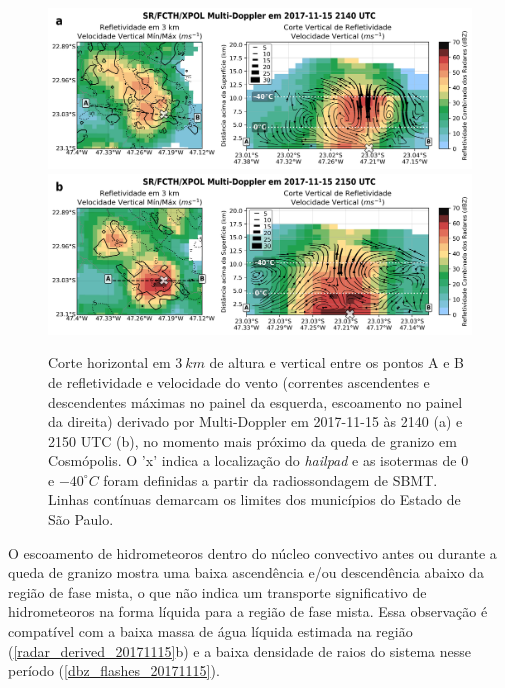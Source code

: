 \begin{figure}[htb]
	\centering
	\caption{Corte horizontal em $3\:km$ de altura e vertical entre os pontos A e B de refletividade e velocidade do vento (correntes ascendentes e descendentes máximas no painel da esquerda, escoamento no painel da direita) derivado por Multi-Doppler em 2017-11-15 às 2140 (a) e 2150 UTC (b), no momento mais próximo da queda de granizo em Cosmópolis. O 'x' indica a localização do \textit{hailpad} e as isotermas de $0$ e $-40^{\circ}C$ foram definidas a partir da radiossondagem de SBMT. Linhas contínuas demarcam os limites dos municípios do Estado de São Paulo.} 
	\label{doppler_20171115}
	\vspace{-5pt}
	\includegraphics[width=\columnwidth]{../MultiDoppler_Processing/figures/SR-FCTH-XPOL 2017-11-15 2140 UTC_ptbr.png} \\
	\vspace{-5pt}
	\includegraphics[width=\columnwidth]{../MultiDoppler_Processing/figures/SR-FCTH-XPOL 2017-11-15 2150 UTC_ptbr.png} \\
\end{figure}

O escoamento de hidrometeoros dentro do núcleo convectivo antes ou durante a queda de granizo mostra uma baixa ascendência e/ou descendência abaixo da região de fase mista, o que não indica um transporte significativo de hidrometeoros na forma líquida para a região de fase mista. Essa observação é compatível com a baixa massa de água líquida estimada na região (\autoref{radar_derived_20171115}b) e a baixa densidade de raios do sistema nesse período (\autoref{dbz_flashes_20171115}).